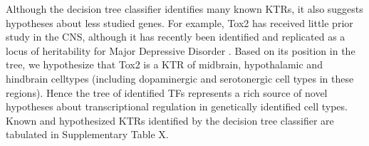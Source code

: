 Although the decision tree classifier identifies many known KTRs, it also suggests hypotheses about less studied genes. For example, Tox2 has received little prior study in the CNS, although it has recently been identified and replicated as a locus of heritability for Major Depressive Disorder \cite{Zeng_2016}. Based on its position in the tree, we hypothesize that Tox2 is a KTR of midbrain, hypothalamic and hindbrain celltypes (including dopaminergic and serotonergic cell types in these regions). Hence the tree of identified TFs represents a rich source of novel hypotheses about transcriptional regulation in genetically identified cell types. Known and hypothesized KTRs identified by the decision tree classifier are tabulated in Supplementary Table X.